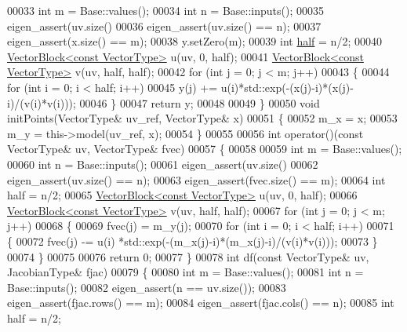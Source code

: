 \begin{DoxyCode}
00033     \textcolor{keywordtype}{int} m = Base::values(); 
00034     \textcolor{keywordtype}{int} n = Base::inputs();
00035     eigen\_assert(uv.size()%
00036     eigen\_assert(uv.size() == n);
00037     eigen\_assert(x.size() == m);
00038     y.setZero(m);
00039     \textcolor{keywordtype}{int} \hyperlink{struct_eigen_1_1half}{half} = n/2;
00040     \hyperlink{group___core___module_class_eigen_1_1_vector_block}{VectorBlock<const VectorType>} u(uv, 0, half);
00041     \hyperlink{group___core___module_class_eigen_1_1_vector_block}{VectorBlock<const VectorType>} v(uv, half, half);
00042     \textcolor{keywordflow}{for} (\textcolor{keywordtype}{int} j = 0; j < m; j++)
00043     \{
00044       \textcolor{keywordflow}{for} (\textcolor{keywordtype}{int} i = 0; i < half; i++)
00045         y(j) += u(i)*std::exp(-(x(j)-i)*(x(j)-i)/(v(i)*v(i)));
00046     \}
00047     \textcolor{keywordflow}{return} y;
00048     
00049   \}
00050   \textcolor{keywordtype}{void} initPoints(VectorType& uv\_ref, VectorType& x)
00051   \{
00052     m\_x = x;
00053     m\_y = this->model(uv\_ref, x);
00054   \}
00055   
00056   \textcolor{keywordtype}{int} operator()(\textcolor{keyword}{const} VectorType& uv, VectorType& fvec)
00057   \{
00058     
00059     \textcolor{keywordtype}{int} m = Base::values(); 
00060     \textcolor{keywordtype}{int} n = Base::inputs();
00061     eigen\_assert(uv.size()%
00062     eigen\_assert(uv.size() == n);
00063     eigen\_assert(fvec.size() == m);
00064     \textcolor{keywordtype}{int} half = n/2;
00065     \hyperlink{group___core___module_class_eigen_1_1_vector_block}{VectorBlock<const VectorType>} u(uv, 0, half);
00066     \hyperlink{group___core___module_class_eigen_1_1_vector_block}{VectorBlock<const VectorType>} v(uv, half, half);
00067     \textcolor{keywordflow}{for} (\textcolor{keywordtype}{int} j = 0; j < m; j++)
00068     \{
00069       fvec(j) = m\_y(j);
00070       \textcolor{keywordflow}{for} (\textcolor{keywordtype}{int} i = 0; i < half; i++)
00071       \{
00072         fvec(j) -= u(i) *std::exp(-(m\_x(j)-i)*(m\_x(j)-i)/(v(i)*v(i)));
00073       \}
00074     \}
00075     
00076     \textcolor{keywordflow}{return} 0;
00077   \}
00078   \textcolor{keywordtype}{int} df(\textcolor{keyword}{const} VectorType& uv, JacobianType& fjac)
00079   \{
00080     \textcolor{keywordtype}{int} m = Base::values(); 
00081     \textcolor{keywordtype}{int} n = Base::inputs();
00082     eigen\_assert(n == uv.size());
00083     eigen\_assert(fjac.rows() == m);
00084     eigen\_assert(fjac.cols() == n);
00085     \textcolor{keywordtype}{int} half = n/2;

\end{DoxyCode}
